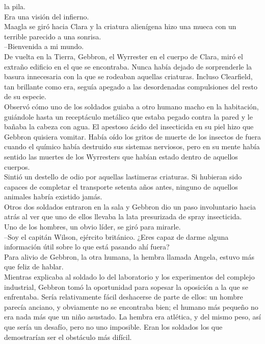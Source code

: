 la pila.\\
Era una visión del infierno.\\
Maagla se giró hacia Clara y la criatura alienígena hizo una mueca con
un terrible parecido a una sonrisa.\\
--Bienvenida a mi mundo.\\[2\baselineskip]De vuelta en la Tierra,
Gebbron, el Wyrrester en el cuerpo de Clara, miró el extraño edificio en
el que se encontraba. Nunca había dejado de sorprenderle la basura
innecesaria con la que se rodeaban aquellas criaturas. Incluso
Clearfield, tan brillante como era, seguía apegado a las desordenadas
compulsiones del resto de su especie.\\
Observó cómo uno de los soldados guiaba a otro humano macho en la
habitación, guiándole hasta un receptáculo metálico que estaba pegado
contra la pared y le bañaba la cabeza con agua. El apestoso ácido del
insecticida en su piel hizo que Gebbron quisiera vomitar. Había oído los
gritos de muerte de los insectos de fuera cuando el químico había
destruido sus sistemas nerviosos, pero en su mente había sentido las
muertes de los Wyrresters que habían estado dentro de aquellos
cuerpos.\\
Sintió un destello de odio por aquellas lastimeras criaturas. Si
hubieran sido capaces de completar el transporte setenta años antes,
ninguno de aquellos animales habría existido jamás.\\
Otros dos soldados entraron en la sala y Gebbron dio un paso
involuntario hacia atrás al ver que uno de ellos llevaba la lata
presurizada de spray insecticida.\\
Uno de los hombres, un obvio líder, se giró para mirarle.\\
--Soy el capitán Wilson, ejército británico. ¿Eres capaz de darme alguna
información útil sobre lo que está pasando ahí fuera?\\
Para alivio de Gebbron, la otra humana, la hembra llamada Angela, estuvo
más que feliz de hablar.\\
Mientras explicaba al soldado lo del laboratorio y los experimentos del
complejo industrial, Gebbron tomó la oportunidad para sopesar la
oposición a la que se enfrentaba. Sería relativamente fácil deshacerse
de parte de ellos: un hombre parecía anciano, y obviamente no se
encontraba bien; el humano más pequeño no era nada más que un niño
asustado. La hembra era atlética, y del mismo peso, así que sería un
desafío, pero no uno imposible. Eran los soldados los que demostrarían
ser el obstáculo más difícil.\\
